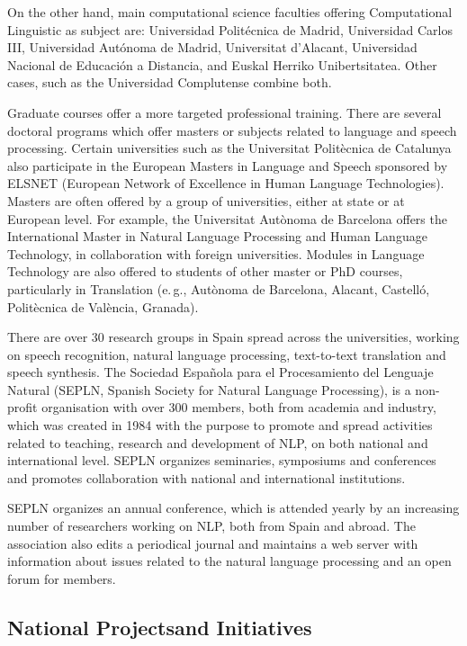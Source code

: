 \begin{multicols}{2}
On the other hand, main computational science faculties offering Computational Linguistic as subject are: Universidad Politécnica de Madrid, Universidad Carlos III, Universidad Autónoma de Madrid, Universitat d’Alacant, Universidad Nacional de Educación a Distancia, and Euskal Herriko Unibertsitatea. Other cases, such as the Universidad Complutense combine both.

Graduate courses offer a more targeted professional training. There are several doctoral programs which offer masters or subjects related to language and speech processing. Certain universities such as the Universitat Politècnica de Catalunya also participate in the European Masters in Language and Speech sponsored by ELSNET (European Network of Excellence in Human Language Technologies). Masters are often offered by a group of universities, either at state or at European level. For example, the Universitat Autònoma de Barcelona offers the International Master in Natural Language Processing and Human Language Technology, in collaboration with foreign universities. Modules in Language Technology are also offered to students of other master or PhD courses, particularly in Translation (e.\,g., Autònoma de Barcelona, Alacant, Castelló, Politècnica de València, Granada).

There are over 30 research groups in Spain spread across the universities, working on speech recognition, natural language processing, text-to-text translation and speech synthesis. The Sociedad Española para el Procesamiento del Lenguaje Natural (SEPLN, Spanish Society for Natural Language Processing), is a non-profit organisation with over 300 members, both from academia and industry, which was created in 1984 with the purpose to promote and spread activities related to teaching, research and development of NLP, on both national and international level. SEPLN organizes seminaries, symposiums and conferences and promotes collaboration with national and international institutions.

SEPLN organizes an annual conference, which is attended yearly by an increasing number of researchers working on NLP, both from Spain and abroad. The association also edits a periodical journal and maintains a web server with information about issues related to the natural language processing and an open forum for members. 

\subsection[National Projects and Initiatives]{National Projects\newline and Initiatives}


\end{multicols}
